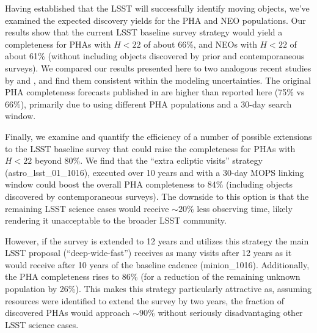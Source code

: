
Having established that the LSST will successfully identify moving objects, we've examined the expected discovery yields for the PHA and NEO populations. Our results show that the current LSST baseline survey strategy would yield a completeness for PHAs with $H<22$ of about 66\%, and NEOs with $H<22$ of about 61\% (without including objects discovered by prior and contemporaneous surveys). We compared our results presented here to two analogous recent studies by \citet[]{GMS2016} and \citet{VeresChesley2017neo}, and find them consistent within the modeling uncertainties. The original
PHA completeness forecasts published in \cite{IvezicNEO2007} are higher than reported here (75\% vs 66\%), primarily due to using different PHA populations and a 30-day search window.

Finally, we examine and quantify the efficiency of a number of possible extensions to the LSST baseline survey that could raise the
completeness for PHAs with $H<22$ beyond 80\%. We find that the ``extra ecliptic visits'' strategy (astro\_lsst\_01\_1016), executed over 10 years and with a 30-day MOPS linking window could boost the overall PHA completeness to 84\% (including objects discovered by contemporaneous surveys). The downside to this option is that the remaining LSST science cases would receive $\sim 20$\% less observing time, likely rendering it unacceptable to the broader LSST community.

However, if the survey is extended to 12 years and utilizes this strategy the main LSST proposal (``deep-wide-fast'') receives as many visits after 12 years as it would receive after 10 years of the
baseline cadence (minion\_1016). Additionally, the PHA completeness rises to 86\% (for a reduction of the remaining unknown population by 26\%). This makes this strategy particularly attractive as, assuming resources were identified to extend the survey by two years, the fraction of discovered PHAs would approach $\sim 90$\% without seriously disadvantaging other LSST science cases.
